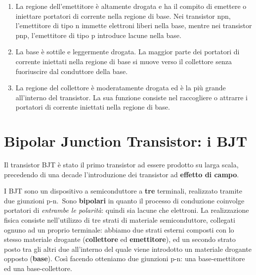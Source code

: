 \documentclass[
]{book}
\providecommand{\tightlist}{%
  \setlength{\itemsep}{0pt}\setlength{\parskip}{0pt}}
\begin{document}
\begin{enumerate}
\def\labelenumi{\arabic{enumi}.}
\tightlist
\item
  La regione dell'emettitore è altamente drogata e ha il compito di
  emettere o iniettare portatori di corrente nella regione di base. Nei
  transistor npn, l'emettitore di tipo n immette elettroni liberi nella
  base, mentre nei transistor pnp, l'emettitore di tipo p introduce
  lacune nella base.
\item
  La base è sottile e leggermente drogata. La maggior parte dei
  portatori di corrente iniettati nella regione di base si muove verso
  il collettore senza fuoriuscire dal conduttore della base.
\item
  La regione del collettore è moderatamente drogata ed è la più grande
  all'interno del transistor. La sua funzione consiste nel raccogliere o
  attrarre i portatori di corrente iniettati nella regione di base.
\end{enumerate}

\section{Bipolar Junction Transistor: i
BJT}\label{bipolar-junction-transistor-i-bjt-1}

Il transistor BJT è stato il primo transistor ad essere prodotto su
larga scala, precedendo di una decade l'introduzione dei transistor ad
\textbf{effetto di campo}.

I BJT sono un dispositivo a semiconduttore a \textbf{tre} terminali,
realizzato tramite due giunzioni p-n.~Sono \textbf{bipolari} in quanto
il processo di conduzione coinvolge portatori di \emph{entrambe le
polarità}: quindi sia lacune che elettroni. \newline La realizzazione
fisica consiste nell'utilizzo di tre strati di materiale semiconduttore,
collegati ognuno ad un proprio terminale: abbiamo due strati esterni
composti con lo stesso materiale drogante (\textbf{collettore} ed
\textbf{emettitore}), ed un secondo strato posto tra gli altri due
all'interno del quale viene introdotto un materiale drogante opposto
(\textbf{base}). Così facendo otteniamo due giunzioni p-n: una
base-emettitore ed una base-collettore.
\end{document}
